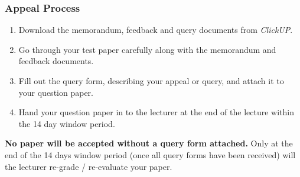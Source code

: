         \subsubsection{Appeal Process}
            \begin{enumerate}
                \item Download the memorandum, feedback and query documents
                    from {\it ClickUP}.
                \item Go through your test paper carefully along with the
                    memorandum and feedback documents.
                \item Fill out the query form, describing your appeal or query,
                    and attach it to your question paper.
                \item Hand your question paper in to the lecturer at the end of
                    the lecture within the 14 day window period.
            \end{enumerate}

            \textbf{No paper will be accepted without a query form attached.}
            Only at the end of the 14 days window period (once all query forms
            have been received) will the lecturer re-grade / re-evaluate your
            paper.
